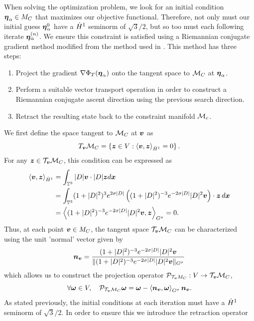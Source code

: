 When solving the optimization problem, we look for an initial condition ${\boldsymbol \eta_\alpha} \in M_C$ that maximizes our objective functional. Therefore, not only must our initial guess ${\boldsymbol \eta_\alpha^0}$ have a $\dot{H}^1$ seminorm of $\sqrt{3}/2$, but so too must each following iterate ${\boldsymbol \eta_\alpha^{(n)}}$. We ensure this constraint is satisfied using a Riemannian conjugate gradient method modified from the method used in \cite{danaila_computation_2017,protas_systematic_2022,zhao_systematic_2023}. This method has three steps: 
\begin{enumerate}
  \item Project the gradient $\nabla\Phi_T({\boldsymbol \eta_\alpha})$ onto the tangent space to $\mathcal{M}_C$ at ${\boldsymbol \eta_\alpha}$.
  \item Perform a suitable vector transport operation in order to construct a Riemannian conjugate ascent direction using the previous search direction.
  \item Retract the resulting state back to the constraint manifold $\mathcal{M}_c$.
\end{enumerate}
We first define the space tangent to $\mathcal{M}_C$ at $\boldsymbol v$ as
\begin{equation}\label{eq:tangent:space}
T_{\boldsymbol v}\mathcal{M}_C = \left\lbrace \boldsymbol z\in V : \left\langle \boldsymbol v,\boldsymbol z\right\rangle_{\dot{H}^1}=0\right\rbrace.
\end{equation}
For any $\boldsymbol z\in \mathcal{T}_{\boldsymbol v}\mathcal{M}_C$, this condition can be expressed as
\begin{subequations}
\begin{align}
\left\langle \boldsymbol v,\boldsymbol z\right\rangle_{\dot{H}^1} &= \int_{\mathbb{T}^3}|D|\boldsymbol v\cdot|D|\boldsymbol z d\boldsymbol x \\
&= \int_{\mathbb{T}^3} (1+|D|^2)^3e^{2\sigma|D|}\left((1+|D|^2)^{-3}e^{-2\sigma|D|}|D|^2\boldsymbol v\right)\cdot\boldsymbol z \,d\boldsymbol x \\
&= \left\langle (1+|D|^2)^{-3}e^{-2\sigma|D|}|D|^2\boldsymbol v,\boldsymbol z\right\rangle_{G^\sigma} = 0.
\end{align}
\end{subequations}
Thus, at each point $\boldsymbol v\in M_C$, the tangent space $\mathcal{T}_{\boldsymbol v}\mathcal{M}_C$ can be characterized using the unit 'normal' vector given by 
\begin{equation}
\boldsymbol n_{\boldsymbol v} = \frac{(1+|D|^2)^{-3}e^{-2\sigma|D|}|D|^2\boldsymbol v}{\|(1+|D|^2)^{-3}e^{-2\sigma|D|}|D|^2\boldsymbol v\|_{G^\sigma}}
\end{equation}
which allows us to construct the projection operator ${\mathcal{P}}_{\mathcal{T}_{\boldsymbol v}M_C}: V \rightarrow \mathcal{T}_{\boldsymbol v}\mathcal{M}_C$, 
\begin{equation}\label{eq:projection:operator}
\forall \boldsymbol \omega \in V, \quad {\mathcal{P}}_{\mathcal{T}_{\boldsymbol v}\mathcal{M}_C}\boldsymbol \omega = \boldsymbol \omega - \left\langle \boldsymbol n_{\boldsymbol v}, \boldsymbol \omega \right\rangle_{G^\sigma}\boldsymbol n_{\boldsymbol v}.
\end{equation}
As stated previously, the initial conditions at each iteration must have a $\dot{H}^1$ seminorm of $\sqrt{3}/2$. In order to ensure this we introduce the retraction operator
